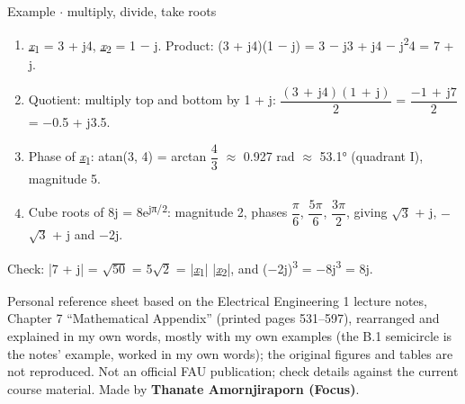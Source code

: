 \documentclass[11pt]{article}
\begin{document}
\begin{keepsection}
\begin{workedbox}{Example \ensuremath{\cdot} multiply, divide, take roots}
\begin{enumerate}
\item \underline{\textit{x}}\textsubscript{1} = 3 + j4, \underline{\textit{x}}\textsubscript{2} = 1 \ensuremath{-} j. Product: (3 + j4)(1 \ensuremath{-} j) = 3 \ensuremath{-} j3 + j4 \ensuremath{-} j\textsuperscript{2}4 = 7 + j.
\item Quotient: multiply top and bottom by 1 + j: {\small\ensuremath{\dfrac{(3\, +\, \mathrm{j}4)(1\, +\, \mathrm{j})}{2}}} = {\small\ensuremath{\dfrac{-1\, +\, \mathrm{j}7}{2}}} = \ensuremath{-}0.5 + j3.5.
\item Phase of \underline{\textit{x}}\textsubscript{1}: atan(3, 4) = arctan {\small\ensuremath{\dfrac{4}{3}}} \ensuremath{\approx} 0.927 rad \ensuremath{\approx} 53.1° (quadrant I), magnitude 5.
\item Cube roots of 8j = 8e\textsuperscript{jπ/2}: magnitude 2, phases {\small\ensuremath{\dfrac{π}{6}}}, {\small\ensuremath{\dfrac{5π}{6}}}, {\small\ensuremath{\dfrac{3π}{2}}}, giving \ensuremath{\sqrt{3}} + j, \ensuremath{-}\ensuremath{\sqrt{3}} + j and \ensuremath{-}2j.
\end{enumerate}

Check: |7 + j| = \ensuremath{\sqrt{50}} = 5\ensuremath{\sqrt{2}} = |\underline{\textit{x}}\textsubscript{1}| |\underline{\textit{x}}\textsubscript{2}|, and (\ensuremath{-}2j)\textsuperscript{3} = \ensuremath{-}8j\textsuperscript{3} = 8j.
\end{workedbox}
\end{keepsection}


\vfill{\small Personal reference sheet based on the Electrical Engineering 1 lecture notes, Chapter 7 “Mathematical Appendix” (printed pages 531–597), rearranged and explained in my own words, mostly with my own examples (the B.1 semicircle is the notes’ example, worked in my own words); the original figures and tables are not reproduced. Not an official FAU publication; check details against the current course material. Made by \textbf{Thanate Amornjiraporn (Focus)}.}
\end{document}
